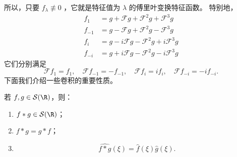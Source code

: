 所以，只要 $f_\lambda \not \equiv 0$ ，它就是特征值为 $\lambda$ 的傅里叶变换特征函数。
特别地，
$$
\begin{aligned}
	f_1 & =g+\mathcal{F} g+\mathcal{F}^2 g+\mathcal{F}^3 g \\
	f_{-1} & =g-\mathcal{F} g+\mathcal{F}^2 g-\mathcal{F}^3 g \\
	f_i & =g-i \mathcal{F} g-\mathcal{F}^2 g+i \mathcal{F}^3 g \\
	f_{-i} & =g+i \mathcal{F} g-\mathcal{F}^2 g-i \mathcal{F}^3 g
\end{aligned}
$$
它们分别满足
$$
\mathcal{F} f_1=f_1, \quad \mathcal{F} f_{-1}=-f_{-1}, \quad \mathcal{F} f_i=i f_i, \quad \mathcal{F} f_{-i}=-i f_{-i} .
$$
下面我们介绍一些卷积的重要性质。
\begin{proposition}\label{prop:convolution-schwartz}
	若 $f,g\in\mathcal S(\R)$，则：
	\begin{enumerate}[label=(\roman*)]
		\item $f*g\in\mathcal S(\R)$；
		\item $f*g=g*f$；
		\item
		\[
		\widehat{f*g}(\xi)=\widehat f(\xi)\widehat g(\xi).
		\]
	\end{enumerate}
\end{proposition}

